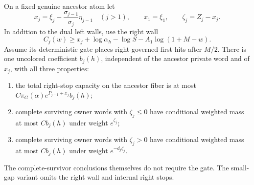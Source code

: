 \begin{lemma}
\label{upper:hard-kernels}
On a fixed genuine ancestor atom let
\begin{equation}
 x_j=\xi_j-\frac{\sigma_{j-1}}{\sigma_j}\eta_{j-1}
 \quad(j>1),\qquad x_1=\xi_1,
 \qquad \zeta_j=Z_j-x_j.
 \label{upper:local-threshold}
\end{equation}
In addition to the dual left walls, use the right wall
\begin{equation}
 C_j(w)\geq x_j+\log\alpha_h-\log S
                         -A_1\log(1+M-w).
 \label{upper:right-wall}
\end{equation}
Assume its deterministic gate places right-governed first hits after
$M/2$.  There is one uncolored coefficient $b_j(h)$, independent of
the ancestor private word and of $x_j$, with all three properties:
\begin{enumerate}
\item the total right-stop capacity on the ancestor fiber is at most
$C\pi_G(\alpha)e^{P_{j-1}+x_j}b_j(h)$;
\item complete surviving owner words with $\zeta_j\leq0$ have conditional
weighted mass at most $Cb_j(h)$ under weight $e^{\zeta_j}$;
\item complete surviving owner words with $\zeta_j>0$ have conditional
weighted mass at most $Cb_j(h)$ under weight $e^{-d_j\zeta_j}$.
\end{enumerate}
The complete-survivor conclusions themselves do not require the gate.
The small-gap variant omits the right wall and internal right stops.
\end{lemma}

